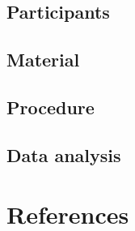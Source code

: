 \documentclass[
  man,floatsintext]{apa6}
\begin{document}
\hypertarget{participants}{%
\subsection{Participants}\label{participants}}

\hypertarget{material}{%
\subsection{Material}\label{material}}

\hypertarget{procedure}{%
\subsection{Procedure}\label{procedure}}

\hypertarget{data-analysis}{%
\subsection{Data analysis}\label{data-analysis}}

\newpage

\hypertarget{references}{%
\section{References}\label{references}}

\begingroup
\setlength{\parindent}{-0.5in}
\setlength{\leftskip}{0.5in}
\end{document}
